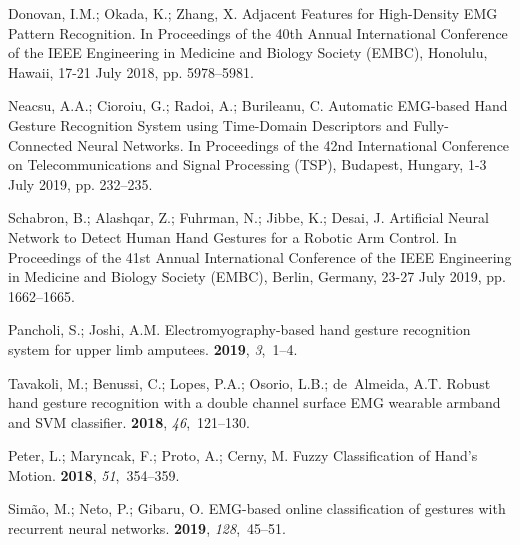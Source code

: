\documentclass[sensors,review,accept,moreauthors,pdftex]{Definitions/mdpi}
\begin{document}
\begin{thebibliography}{999}
Donovan, I.M.; Okada, K.; Zhang, X.
\newblock Adjacent Features for High-Density EMG Pattern Recognition.
In {Proceedings of the }40th Annual International Conference of the IEEE Engineering in Medicine and Biology Society (EMBC), Honolulu, Hawaii, 17-21 July 2018, pp. 5978--5981.

Neacsu, A.A.; Cioroiu, G.; Radoi, A.; Burileanu, C.
\newblock Automatic EMG-based Hand Gesture Recognition System using Time-Domain
  Descriptors and Fully-Connected Neural Networks.
In {Proceedings of the } 42nd International Conference on Telecommunications and Signal Processing (TSP), Budapest, Hungary, 1-3 July 2019, pp. 232--235.

Schabron, B.; Alashqar, Z.; Fuhrman, N.; Jibbe, K.; Desai, J.
\newblock Artificial Neural Network to Detect Human Hand Gestures for a Robotic
  Arm Control.
In {Proceedings of the } 41st Annual International Conference of the IEEE Engineering in Medicine and Biology Society (EMBC), Berlin, Germany, 23-27 July 2019, pp. 1662--1665.

Pancholi, S.; Joshi, A.M.
\newblock Electromyography-based hand gesture recognition system for upper limb
  amputees.
 {\bf 2019}, {\em 3},~1--4.

Tavakoli, M.; Benussi, C.; Lopes, P.A.; Osorio, L.B.; de~Almeida, A.T.
\newblock Robust hand gesture recognition with a double channel surface EMG
  wearable armband and SVM classifier.
 {\bf 2018}, {\em
  46},~121--130.

Peter, L.; Maryncak, F.; Proto, A.; Cerny, M.
\newblock Fuzzy Classification of Hand’s Motion.
 {\bf 2018}, {\em 51},~354--359.

Sim{\~a}o, M.; Neto, P.; Gibaru, O.
\newblock EMG-based online classification of gestures with recurrent neural
  networks.
 {\bf 2019}, {\em 128},~45--51.


\end{thebibliography}
\end{document}
